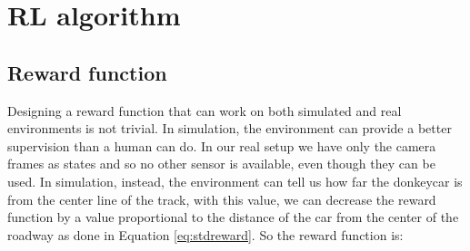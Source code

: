 \begin{center}
    \begin{minipage}{0.9\linewidth}
      
      \end{minipage}
    \begin{minipage}{0.9\linewidth}
      
      \end{minipage}
\end{center}

\section{RL algorithm}

\subsection{Reward function}
Designing a reward function that can work on both simulated and real environments is not trivial. In simulation, the environment can provide a better supervision than a human can do. In our real setup we have only the camera frames as states and so no other sensor is available, even though they can be used. In simulation, instead, the environment can tell us how far the donkeycar is from the center line of the track, with this value, we can decrease the reward function by a value proportional to the distance of the car from the center of the roadway as done in Equation \ref{eq:stdreward}. So the reward function is:

